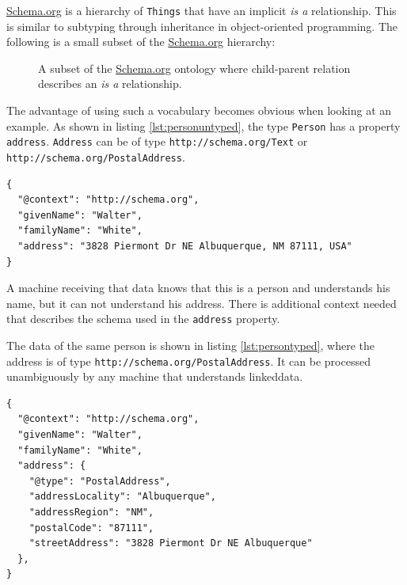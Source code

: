 \url{Schema.org} is a hierarchy of \lstinline{Things} that have an implicit \textit{is a} relationship. This is similar to subtyping through inheritance in object-oriented programming. The following is a small subset of the \url{Schema.org} hierarchy:

\begin{figure}[!htb]
  \caption{ A subset of the \url{Schema.org} ontology where child-parent relation describes an \textit{is a} relationship.}
  \label{fig:schemaorg}
\end{figure}

The advantage of using such a vocabulary becomes obvious when looking at an example. As shown in listing \ref{lst:personuntyped}, the type \lstinline{Person} has a property \lstinline{address}. \lstinline{Address} can be of type \lstinline{http://schema.org/Text} or \lstinline{http://schema.org/PostalAddress}.

\lstset{language=JSON}
\begin{lstlisting}[caption=A person with an address of type \lstinline{http://schema.org/Text}., label=lst:personuntyped]
{
  "@context": "http://schema.org",
  "givenName": "Walter",
  "familyName": "White",
  "address": "3828 Piermont Dr NE Albuquerque, NM 87111, USA"
}
\end{lstlisting}

A machine receiving that data knows that this is a person and understands his name, but it can not understand his address. There is additional context needed that describes the schema used in the \lstinline{address} property.

The data of the same person is shown in listing \ref{lst:persontyped}, where the address is of type \lstinline{http://schema.org/PostalAddress}. It can be processed unambiguously by any machine that understands \gls{linkeddata}.

\lstset{language=JSON}
\begin{lstlisting}[caption=A person with an address of type \lstinline{http://schema.org/PostalAddress}., label=lst:persontyped]
{
  "@context": "http://schema.org",
  "givenName": "Walter",
  "familyName": "White",
  "address": {
    "@type": "PostalAddress",
    "addressLocality": "Albuquerque",
    "addressRegion": "NM",
    "postalCode": "87111",
    "streetAddress": "3828 Piermont Dr NE Albuquerque"
  },
}
\end{lstlisting}

